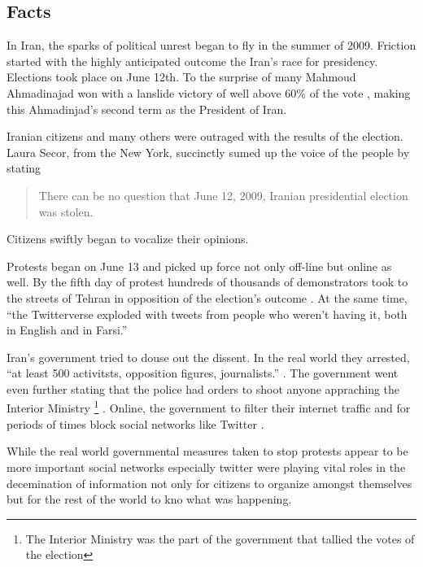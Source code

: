 \documentclass[11pt]{article}
\begin{document}
\begin{multicols}{2}
\setcounter{page}{1}
\section{Facts} 

In Iran, the sparks of political unrest began to fly in the summer of 2009.
Friction started with the highly anticipated outcome the Iran's race for
presidency. Elections took place on June 12th. To the surprise of many Mahmoud
Ahmadinajad won with a lanslide victory of well above 60\% of the vote
\cite{TheIranianVote, IranianElectionResultsByProvince}, making this
Ahmadinjad's second term as the President of Iran.


Iranian citizens and many others were outraged with the results of the election.
Laura Secor, from the New York, succinctly sumed up the voice of the people by
stating \begin{quotation} There can be no question that June 12, 2009, Iranian
presidential election was stolen. \cite{TheIranianVote}\end{quotation} Citizens
swiftly began to vocalize their opinions.


Protests began on June 13 and picked up force not only off-line but online as
well. By the fifth day of protest hundreds of thousands of demonstrators took to
the streets of Tehran in opposition of the election's outcome
\cite{IranProtestsFifthDayOfUnrest}. At the same time, ``the Twitterverse
exploded with tweets from people who weren't having it, both in English and in
Farsi.'' \cite{WhyTwitterIsTheMedium}


Iran's government tried to douse out the dissent. In the real world they
arrested, ``at least 500 activitsts, opposition figures, journalists.''
\cite{IranProtestsFifthDayOfUnrest}. The government went even further stating
that the police had orders to shoot anyone appraching the Interior Ministry
\footnote{The Interior Ministry was the part of the government that tallied the
votes of the election} \cite{TheIranianVote}. Online, the government to filter
their internet traffic and for periods of times block social networks like
Twitter \cite{IranBlocksFacebookTwitter}.


While the real world governmental measures taken to stop protests appear to be
more important social networks especially twitter were playing vital roles in
the decemination of information not only for citizens to organize amongst
themselves but for the rest of the world to kno what was happening.


\end{multicols}
\end{document}
